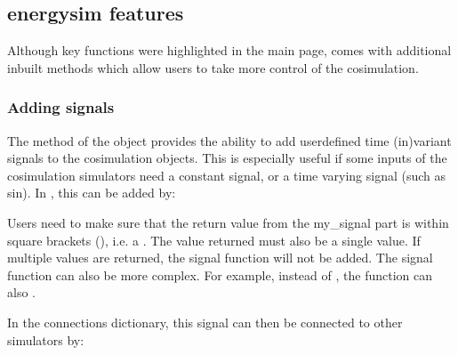 \documentclass[letterpaper,10pt,english]{sphinxmanual}
\begin{document}
\subsection{energysim features}
\label{\detokenize{energysim_features:energysim-features}}\label{\detokenize{energysim_features::doc}}
Although key functions were highlighted in the main page,  comes
with additional inbuilt methods which allow users to take more control of the cosimulation.


\subsubsection{Adding signals}
\label{\detokenize{energysim_features:adding-signals}}
The  method of the  object provides the ability to add user\sphinxhyphen{}defined time (in)variant signals to the cosimulation objects. This is especially useful if some inputs of the cosimulation simulators need a constant signal, or a time varying signal (such as sin). In , this can be added by:

\begin{sphinxVerbatim}[commandchars=\\\{\}]
 
     \PYG{p}{[}\PYG{p}{]}

    
\end{sphinxVerbatim}

Users need to make sure that the return value from the my\_signal part is within square brackets (\sphinxstylestrong{{[} {]}}), i.e. a . The value returned must also be a single value. If multiple values are returned, the signal function will not be added. The signal function can also be more complex. For example, instead of , the  function can also .

In the connections dictionary, this signal can then be connected to other simulators by:
\end{document}
